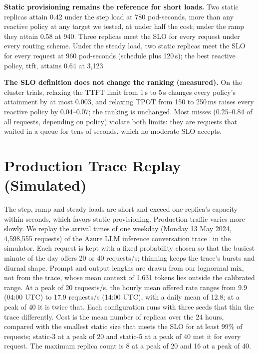 \documentclass[10pt,conference]{IEEEtran}
\begin{document}
\textbf{Static provisioning remains the reference for short loads.} Two static replicas attain
0.42 under the step load at 780 pod-seconds, more than any reactive policy at
any target we tested, at under half the cost; under the ramp they attain 0.58 at
940. Three replicas meet the SLO for every request under every routing
scheme. Under the steady load, two static replicas meet the SLO for every
request at 960 pod-seconds (schedule plus 120\,s); the best reactive policy,
ttft, attains 0.64 at 3{,}123.

\textbf{The SLO definition does not change the ranking (measured).} On the
cluster trials, relaxing the TTFT limit from 1\,s to 5\,s changes every
policy's attainment by at most 0.003, and relaxing TPOT from 150 to 250\,ms
raises every reactive policy by 0.04--0.07; the ranking is unchanged. Most
misses (0.25--0.84 of all requests, depending on policy) violate both limits:
they are requests that waited in a queue for tens of seconds, which no
moderate SLO accepts.

\section{Production Trace Replay (Simulated)}
\label{sec:trace}
The step, ramp and steady loads are short and exceed one replica's capacity
within seconds, which favors static provisioning. Production traffic varies
more slowly. We replay the arrival times of one weekday (Monday 13 May 2024,
4{,}598{,}555 requests) of the Azure LLM inference conversation
trace~\cite{azuretrace2024,stojkovic2025dynamollm} in the simulator. Each
request is kept with a fixed probability chosen so that the busiest minute of
the day offers 20 or 40 requests/s; thinning keeps the trace's bursts and
diurnal shape. Prompt and output lengths are drawn from our lognormal mix, not
from the trace, whose mean context of 1{,}631 tokens lies outside the
calibrated range. At a peak of 20 requests/s, the hourly mean offered rate
ranges from 9.9 (04:00 UTC) to 17.9 requests/s (14:00 UTC), with a daily
mean of 12.8; at a peak of 40 it is twice that. Each configuration runs with
three seeds that thin the trace differently. Cost is the mean number of
replicas over the 24 hours, compared with the smallest static size that
meets the SLO for at least 99\% of requests; static-3 at a peak of 20 and
static-5 at a peak of 40 met it for every request. The maximum replica
count is 8 at a peak of 20 and 16 at a peak of 40.
\end{document}
